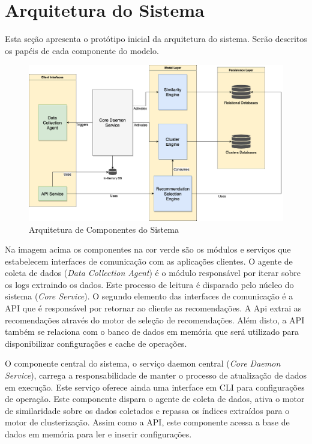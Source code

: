 \documentclass[
	12pt,				%
    oneside,			%
	a4paper,			%
	english,			%
	french,				%
	spanish,			%
	brazil,				%
	]{abntex2}
\begin{document}
\section{Arquitetura do Sistema}
Esta seção apresenta o protótipo inicial da arquitetura do sistema. Serão descritos os papéis de cada componente do modelo.
\begin{figure}[hbt]
	\label{Arquitetura de Componentes do Sistema}
	\caption{Arquitetura de Componentes do Sistema}
	\includegraphics[width=160mm]{system-architecture.png}
\end{figure}

Na imagem acima os componentes na cor verde são os módulos e serviços que estabelecem interfaces de comunicação com as aplicações clientes. O agente de coleta de dados (\textit{Data Collection Agent}) é o módulo responsável por iterar sobre os
logs extraindo os dados. Este processo de leitura é disparado pelo núcleo do sistema (\textit{Core Service}).
O segundo elemento das interfaces de comunicação é a API que é responsável por retornar ao cliente as recomendações. A Api extrai as recomendações através do motor de seleção de recomendações. Além disto, a API também se relaciona com o banco
de dados em memória que será utilizado para disponibilizar configurações e cache de operações.

O componente central do sistema, o serviço daemon central (\textit{Core Daemon Service}), carrega a responsabilidade de manter o processo de atualização de dados em execução. Este serviço oferece ainda uma interface em CLI para configurações
de operação. Este componente dispara o agente de coleta de dados, ativa o motor de similaridade sobre os dados coletados e repassa os índices extraídos para o motor de clusterização. Assim como a API, este componente acessa a base de dados
em memória para ler e inserir configurações.
\end{document}
